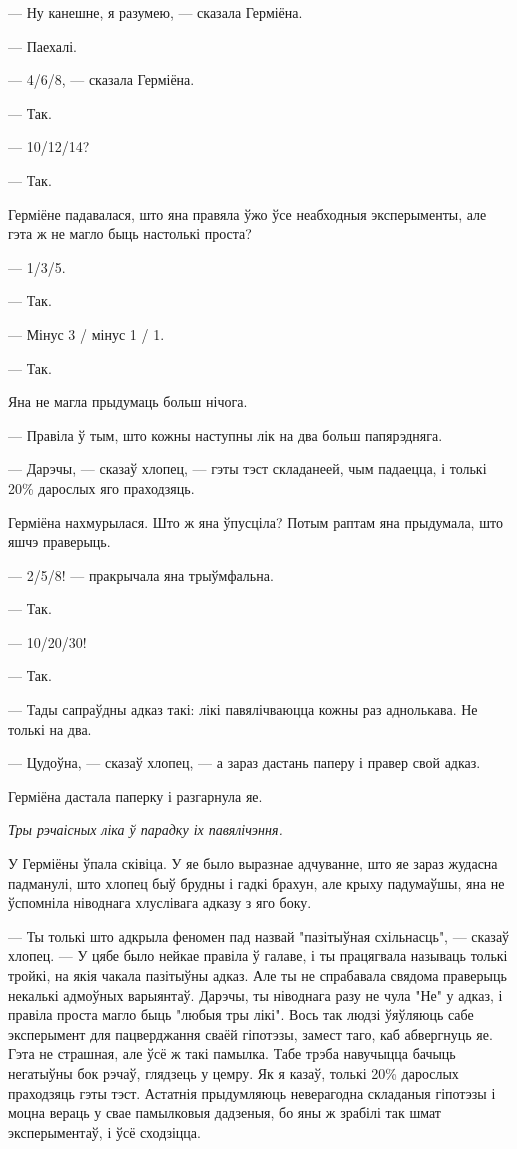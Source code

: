--- Ну канешне, я разумею, --- сказала Герміёна.

--- Паехалі.

--- 4/6/8, --- сказала Герміёна.

--- Так.

--- 10/12/14?

--- Так.

Герміёне падавалася, што яна правяла ўжо ўсе неабходныя эксперыменты, але 
гэта ж не магло быць настолькі проста?

--- 1/3/5.

--- Так.

--- Мінус 3 / мінус 1 / 1.

--- Так.

Яна не магла прыдумаць больш нічога. 

--- Правіла ў тым, што кожны наступны лік на два больш папярэдняга.

--- Дарэчы, --- сказаў хлопец, --- гэты тэст складанеей, чым падаецца, і толькі 
20\% дарослых яго праходзяць. 

Герміёна нахмурылася. Што ж яна ўпусціла? Потым раптам яна прыдумала, што яшчэ праверыць.

--- 2/5/8! --- пракрычала яна трыўмфальна.

--- Так.

--- 10/20/30! 

--- Так.

--- Тады сапраўдны адказ такі: лікі павялічваюцца кожны раз аднолькава. Не толькі на два.

--- Цудоўна, --- сказаў хлопец, --- а зараз дастань паперу і правер свой адказ.

Герміёна дастала паперку і разгарнула яе.

\emph{Тры рэчаісных ліка ў парадку іх павялічэння.}

У Герміёны ўпала сківіца. У яе было выразнае адчуванне, што яе зараз жудасна падманулі,
што хлопец быў брудны і гадкі брахун, але крыху падумаўшы, яна не ўспомніла 
ніводнага хлуслівага адказу з яго боку.

--- Ты толькі што адкрыла феномен пад назвай "пазітыўная схільнасць", --- сказаў хлопец.
--- У цябе было нейкае правіла ў галаве, і ты працягвала называць толькі тройкі, на
якія чакала пазітыўны адказ. Але ты не спрабавала свядома праверыць некалькі 
адмоўных варыянтаў. Дарэчы, ты ніводнага разу не чула "Не" у адказ, і правіла 
проста магло быць "любыя тры лікі". Вось так людзі ўяўляюць
сабе эксперымент для пацверджання сваёй гіпотэзы, замест таго, каб абвергнуць яе.
Гэта не страшная, але ўсё ж такі памылка. Табе трэба навучыцца бачыць негатыўны
бок рэчаў, глядзець у цемру. Як я казаў, толькі 20\% дарослых праходзяць гэты тэст.
Астатнія прыдумляюць неверагодна складаныя гіпотэзы і моцна вераць у свае 
памылковыя дадзеныя, бо яны ж зрабілі так шмат эксперыментаў, і ўсё сходзіцца.

